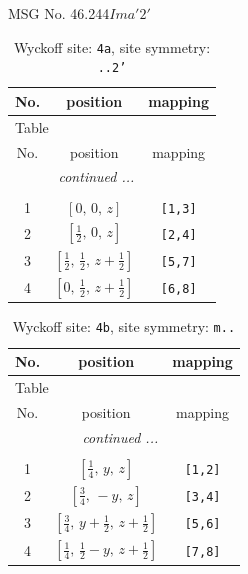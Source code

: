 \documentclass[fleqn,8pt]{jsarticle}
\begin{document}
\setcounter{MaxMatrixCols}{32}

\renewcommand{\tablename}{Table~}
\renewcommand{\figurename}{Figure~}
\begin{center}
\LARGE
MSG No. 46.244\quad$Ima'2'$
\end{center}
\renewcommand{\arraystretch}{1.2}
\begin{longtable}{ccc}
\caption{Wyckoff site: {\tt 4a}, site symmetry: {\tt ..2'}}
 \\
 \hline \hline
No. & position & mapping \\ \hline \endfirsthead

\multicolumn{2}{l}{\tablename\ \thetable{}} \\
 \hline \hline
No. & position & mapping \\ \hline \endhead

 \hline \hline
\multicolumn{2}{r}{\footnotesize\it continued ...} \\ \endfoot

 \hline \hline
\multicolumn{2}{r}{} \\ \endlastfoot

1 & $\left[ 0,\, 0,\, z \right]$ & {\tt [1,3]} \\ \hline
2 & $\left[ \frac{1}{2},\, 0,\, z \right]$ & {\tt [2,4]} \\ \hline
3 & $\left[ \frac{1}{2},\, \frac{1}{2},\, z + \frac{1}{2} \right]$ & {\tt [5,7]} \\ \hline
4 & $\left[ 0,\, \frac{1}{2},\, z + \frac{1}{2} \right]$ & {\tt [6,8]} \\
\end{longtable}
\renewcommand{\arraystretch}{1.2}
\begin{longtable}{ccc}
\caption{Wyckoff site: {\tt 4b}, site symmetry: {\tt m..}}
 \\
 \hline \hline
No. & position & mapping \\ \hline \endfirsthead

\multicolumn{2}{l}{\tablename\ \thetable{}} \\
 \hline \hline
No. & position & mapping \\ \hline \endhead

 \hline \hline
\multicolumn{2}{r}{\footnotesize\it continued ...} \\ \endfoot

 \hline \hline
\multicolumn{2}{r}{} \\ \endlastfoot

1 & $\left[ \frac{1}{4},\, y,\, z \right]$ & {\tt [1,2]} \\ \hline
2 & $\left[ \frac{3}{4},\, - y,\, z \right]$ & {\tt [3,4]} \\ \hline
3 & $\left[ \frac{3}{4},\, y + \frac{1}{2},\, z + \frac{1}{2} \right]$ & {\tt [5,6]} \\ \hline
4 & $\left[ \frac{1}{4},\, \frac{1}{2} - y,\, z + \frac{1}{2} \right]$ & {\tt [7,8]} \\
\end{longtable}
\end{document}

